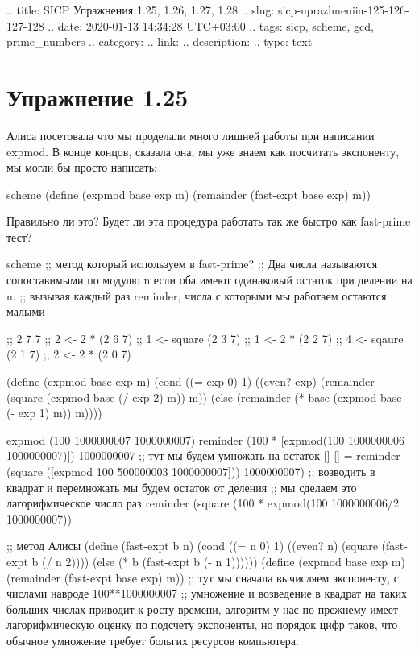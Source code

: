 .. title: SICP Упражнения 1.25, 1.26, 1.27, 1.28
.. slug: sicp-uprazhneniia-125-126-127-128
.. date: 2020-01-13 14:34:28 UTC+03:00
.. tags: sicp, scheme, gcd, prime_numbers
.. category: 
.. link: 
.. description: 
.. type: text


\chapter{Упражнение 1.25}

Алиса посетовала что мы проделали много лишней работы при написании expmod. В конце концов, сказала она, мы уже знаем как посчитать экспоненту, мы могли бы просто написать:

\begin{codelisting}{scheme}
(define (expmod base exp m)
  (remainder (fast-expt base exp) m))
\end{codelisting}

Правильно ли это? Будет ли эта процедура работать так же быстро как fast-prime тест?

\begin{codelisting}{scheme}
;; метод который используем в fast-prime?
;; Два числа называются сопоставимыми по модулю n если оба имеют одинаковый остаток при делении на n.
;; вызывая каждый раз reminder, числа с которыми мы работаем остаются малыми

;; 2 7 7
;; 2 <- 2 * (2 6 7)
;; 1 <- square (2 3 7)
;; 1 <- 2 * (2 2 7)
;; 4 <- sqaure (2 1 7)
;; 2 <- 2 * (2 0 7)

(define (expmod base exp m)
  (cond ((= exp 0) 1)
        ((even? exp)
         (remainder (square (expmod base (/ exp 2) m))
                    m))
        (else
         (remainder (* base (expmod base (- exp 1) m))
                    m))))

expmod (100 1000000007 1000000007)
reminder (100 * [expmod(100 1000000006 1000000007)]) 1000000007
;; тут мы будем умножать на остаток []
[] = reminder (square ([expmod 100 500000003 1000000007])) 1000000007)
;; возводить в квадрат и перемножать мы будем остаток от деления
;; мы сделаем это лагорифмическое число раз
reminder (square (100 * expmod(100 1000000006/2 1000000007))

;; метод Алисы
(define (fast-expt b n)
  (cond ((= n 0) 1)
        ((even? n) (square (fast-expt b (/ n 2))))
        (else (* b (fast-expt b (- n 1))))))
(define (expmod base exp m)
  (remainder (fast-expt base exp) m))
;; тут мы сначала вычисляем экспоненту, с числами навроде 100**1000000007
;; умножение и возведение в квадрат на таких больших числах приводит к росту времени, алгоритм у нас по прежнему имеет лагорифмическую оценку по подсчету экспоненты, но порядок цифр таков, что обычное умножение требует больгих ресурсов компьютера.
\end{codelisting}

